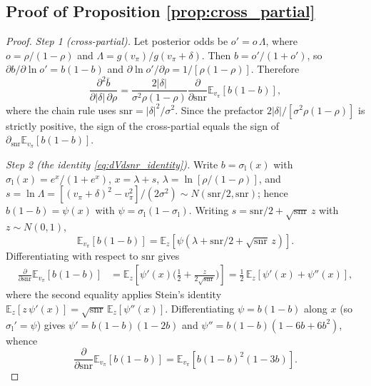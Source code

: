\documentclass[12pt,letter,leqno]{article}
\theoremstyle{asn}
\theoremstyle{lem}
\theoremstyle{slem}
\theoremstyle{prop}
\theoremstyle{appprop}
\theoremstyle{rem}
\theoremstyle{defn}
\begin{document}
\subsection{Proof of Proposition \ref{prop:cross_partial}}
\begin{proof}
  \emph{Step 1 (cross-partial).} Let posterior odds be
  $o'=o\,\Lambda$, where $o=\rho/(1-\rho)$ and
  $\Lambda=g(v_\pi)/g(v_\pi+\delta)$. Then $b=o'/(1+o')$, so
  $\partial b/\partial\ln o'=b(1-b)$ and
  $\partial\ln o'/\partial\rho=1/[\rho(1-\rho)]$. Therefore
  \[
  \frac{\partial^2\bar b}{\partial|\delta|\,\partial\rho}
  =
  \frac{2|\delta|}{\sigma^2\rho(1-\rho)}
  \frac{\partial}{\partial \mathrm{snr}}\mathbb{E}_{v_\pi}[b(1-b)],
  \]
  where the chain rule uses $\mathrm{snr}=|\delta|^2/\sigma^2$. Since the prefactor
  $2|\delta|/[\sigma^2\rho(1-\rho)]$ is strictly positive, the sign of the
  cross-partial equals the sign of
  $\partial_{\mathrm{snr}}\mathbb{E}_{v_\pi}[b(1-b)]$.
  
  \emph{Step 2 (the identity \eqref{eq:dVdsnr_identity}).} Write
  $b=\sigma_{\mathrm{l}}(x)$ with
  $\sigma_{\mathrm{l}}(x)=e^{x}/(1+e^{x})$, $x=\lambda+s$,
  $\lambda=\ln[\rho/(1-\rho)]$, and
  $s=\ln\Lambda=[(v_\pi+\delta)^2-v_\pi^2]/(2\sigma^2)\sim N(\mathrm{snr}/2,\mathrm{snr})$;
  hence $b(1-b)=\psi(x)$ with $\psi=\sigma_{\mathrm{l}}(1-\sigma_{\mathrm{l}})$.
  Writing $s=\mathrm{snr}/2+\sqrt{\mathrm{snr}}\,z$ with $z\sim N(0,1)$,
  \[
  \mathbb{E}_{v_\pi}[b(1-b)]
  =
  \mathbb{E}_z[\psi(\lambda+\mathrm{snr}/2+\sqrt{\mathrm{snr}}\,z)].
  \]
  Differentiating with respect to $\mathrm{snr}$ gives
  \begin{align}
  \frac{\partial}{\partial \mathrm{snr}}\mathbb{E}_{v_\pi}[b(1-b)]
  &=
  \mathbb{E}_z\!\left[\psi'(x)\Big(\tfrac12+\tfrac{z}{2\sqrt{\mathrm{snr}}}\Big)\right]
  =
  \tfrac12\,\mathbb{E}_z[\psi'(x)+\psi''(x)],
  \end{align}
  where the second equality applies Stein's identity
  $\mathbb{E}_z[z\,\psi'(x)]=\sqrt{\mathrm{snr}}\,\mathbb{E}_z[\psi''(x)]$.
  Differentiating $\psi=b(1-b)$ along $x$ (so $\sigma_{\mathrm{l}}'=\psi$) gives
  $\psi'=b(1-b)(1-2b)$ and $\psi''=b(1-b)(1-6b+6b^2)$, whence
  \begin{equation}
  \frac{\partial}{\partial \mathrm{snr}}\mathbb{E}_{v_\pi}[b(1-b)]
  =
  \mathbb{E}_{v_\pi}\!\left[b(1-b)^2(1-3b)\right].
  \label{eq:dVdsnr_identity}
  \end{equation}
  

\end{proof}
\end{document}
